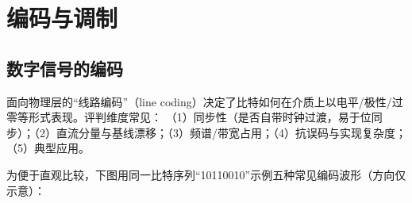 \documentclass[lang=cn,newtx,10pt,scheme=chinese]{../../elegantbook}
\begin{document}
\begin{center}
{\setlength{\fboxsep}{6pt}%
}%
\end{center}

\section{编码与调制}
\subsection{数字信号的编码}
面向物理层的“线路编码”（line coding）决定了比特如何在介质上以电平/极性/过零等形式表现。评判维度常见：
（1）同步性（是否自带时钟过渡，易于位同步）；（2）直流分量与基线漂移；（3）频谱/带宽占用；（4）抗误码与实现复杂度；（5）典型应用。

为便于直观比较，下图用同一比特序列“10110010”示例五种常见编码波形（方向仅示意）：
\end{document}
